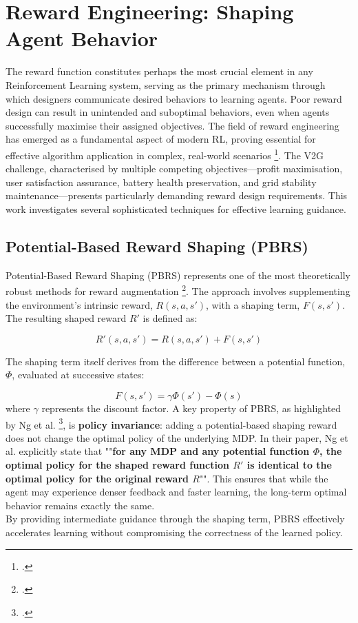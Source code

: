 \section{Reward Engineering: Shaping Agent Behavior}
\label{sec:reward_shaping}

The reward function constitutes perhaps the most crucial element in any Reinforcement Learning system, serving as the primary mechanism through which designers communicate desired behaviors to learning agents. Poor reward design can result in unintended and suboptimal behaviors, even when agents successfully maximise their assigned objectives. The field of reward engineering has emerged as a fundamental aspect of modern RL, proving essential for effective algorithm application in complex, real-world scenarios \footcite{ibrahim2024comprehensive}. The V2G challenge, characterised by multiple competing objectives—profit maximisation, user satisfaction assurance, battery health preservation, and grid stability maintenance—presents particularly demanding reward design requirements. This work investigates several sophisticated techniques for effective learning guidance.
\subsection{Potential-Based Reward Shaping (PBRS)}

Potential-Based Reward Shaping (PBRS) represents one of the most theoretically robust methods for reward augmentation \footcite{ng1999policy}. The approach involves supplementing the environment's intrinsic reward, $R(s, a, s')$, with a shaping term, $F(s, s')$. The resulting shaped reward $R'$ is defined as:

\[
R'(s, a, s') = R(s, a, s') + F(s, s')
\]

The shaping term itself derives from the difference between a potential function, $\Phi$, evaluated at successive states:

\[
F(s, s') = \gamma \Phi(s') - \Phi(s)
\]
\noindent
where $\gamma$ represents the discount factor. 
\noindent
A key property of PBRS, as highlighted by Ng et al. \footcite{ng1999policy}, is \textbf{policy invariance}: adding a potential-based shaping reward does not change the optimal policy of the underlying MDP. In their paper, Ng et al. explicitly state that ""\textbf{for any MDP and any potential function $\Phi$, the optimal policy for the shaped reward function $R'$ is identical to the optimal policy for the original reward $R$}"". This ensures that while the agent may experience denser feedback and faster learning, the long-term optimal behavior remains exactly the same.
\\
\noindent
By providing intermediate guidance through the shaping term, PBRS effectively accelerates learning without compromising the correctness of the learned policy.


